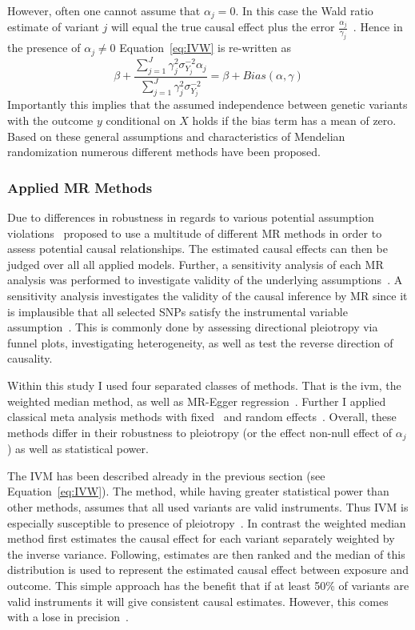However, often one cannot assume that $\alpha_j = 0$.
In this case the Wald ratio estimate of variant $j$ will equal the true causal effect plus the error $\frac{\alpha_j}{\gamma_j}$~\cite{Bowden2015}. 
Hence in the presence of $\alpha_j \neq 0$ Equation~\ref{eq:IVW} is re-written as
\begin{equation} \label{eq:TSLSbias}
  \beta + \frac{\sum^J_{j=1} \gamma_j^2\sigma_{Y_j}^{-2} \alpha_j}
  {\sum^J_{j=1} \gamma_j^2\sigma_{Y_j}^{-2}} = \beta + Bias(\alpha, \gamma)
\end{equation}
Importantly this implies that the assumed independence between genetic variants with the outcome $y$ conditional on $X$ holds if the bias term has a mean of zero.
Based on these general assumptions and characteristics of Mendelian randomization numerous different methods have been proposed.

\subsubsection{Applied MR Methods}
\label{ssub:Used_Metheds}

Due to differences in robustness in regards to various potential assumption violations~\citet{Burgess2016} proposed to use a multitude of different MR methods in order to assess potential causal relationships.
The estimated causal effects can then be judged over all all applied models.
Further, a sensitivity analysis of each MR analysis was performed to investigate validity of the underlying assumptions~\cite{Burgess2016}.
A sensitivity analysis investigates the validity of the causal inference by MR since it is implausible that all selected SNPs satisfy the instrumental variable assumption~\cite{Burgess2016}.
This is commonly done by assessing directional pleiotropy via funnel plots, investigating heterogeneity, as well as test the reverse direction of causality.

Within this study I used four separated classes of methods.
That is the \acrfull{ivm}, the weighted median method, as well as MR-Egger regression~\cite{Bowden2015}.
Further I applied classical meta analysis methods with fixed~\cite{Nelson2015a} and random effects~\cite{Ahmad2015a}.
Overall, these methods differ in their robustness to pleiotropy (or the effect non-null effect of $\alpha_j$) as well as statistical power.

The IVM has been described already in the previous section (see Equation~\ref{eq:IVW}).
The method, while having greater statistical power than other methods, assumes that all used variants are valid instruments.
Thus IVM is especially susceptible to presence of pleiotropy~\cite{Burgess2015b}.
In contrast the weighted median method first estimates the causal effect for each variant separately weighted by the inverse variance. 
Following, estimates are then ranked and the median of this distribution is used to represent the estimated causal effect between exposure and outcome.
This simple approach has the benefit that if at least 50\% of variants are valid instruments it will give consistent causal estimates.
However, this comes with a lose in precision~\cite{Bowden2015}.

